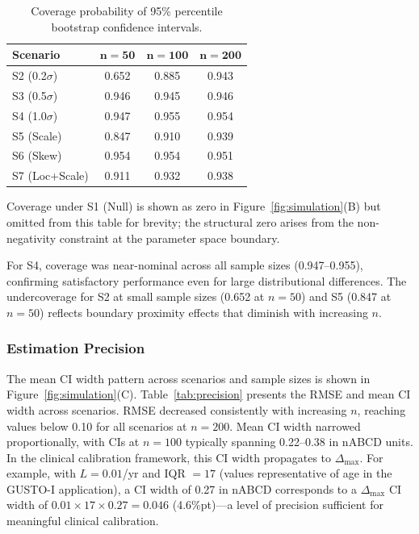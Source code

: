 \documentclass[AMA,Times1COL]{WileyNJDv5}
\begin{document}
\begin{table}[ht]
\centering
\caption{Coverage probability of 95\% percentile bootstrap confidence intervals.\label{tab:coverage}}
\begin{tabular}{lccc}
\toprule
\textbf{Scenario} & $\boldsymbol{n=50}$ & $\boldsymbol{n=100}$ & $\boldsymbol{n=200}$ \\
\midrule
S2 (0.2$\sigma$) & 0.652 & 0.885 & 0.943 \\
S3 (0.5$\sigma$) & 0.946 & 0.945 & 0.946 \\
S4 (1.0$\sigma$) & 0.947 & 0.955 & 0.954 \\
S5 (Scale) & 0.847 & 0.910 & 0.939 \\
S6 (Skew) & 0.954 & 0.954 & 0.951 \\
S7 (Loc+Scale) & 0.911 & 0.932 & 0.938 \\
\bottomrule
\end{tabular}
\begin{tablenotes}
\item Coverage under S1 (Null) is shown as zero in Figure~\ref{fig:simulation}(B) but omitted from this table for brevity; the structural zero arises from the non-negativity constraint at the parameter space boundary.
\item For S4, coverage was near-nominal across all sample sizes (0.947--0.955), confirming satisfactory performance even for large distributional differences. The undercoverage for S2 at small sample sizes (0.652 at $n=50$) and S5 (0.847 at $n=50$) reflects boundary proximity effects that diminish with increasing $n$.
\end{tablenotes}
\end{table}

\subsubsection{Estimation Precision}

The mean CI width pattern across scenarios and sample sizes is shown in Figure~\ref{fig:simulation}(C). Table~\ref{tab:precision} presents the RMSE and mean CI width across scenarios. RMSE decreased consistently with increasing $n$, reaching values below 0.10 for all scenarios at $n = 200$. Mean CI width narrowed proportionally, with CIs at $n = 100$ typically spanning 0.22--0.38 in nABCD units. In the clinical calibration framework, this CI width propagates to $\Delta_{\max}$. For example, with $L = 0.01$/yr and IQR $= 17$ (values representative of age in the GUSTO-I application), a CI width of 0.27 in nABCD corresponds to a $\Delta_{\max}$ CI width of $0.01 \times 17 \times 0.27 = 0.046$ (4.6\%pt)---a level of precision sufficient for meaningful clinical calibration.
\end{document}
